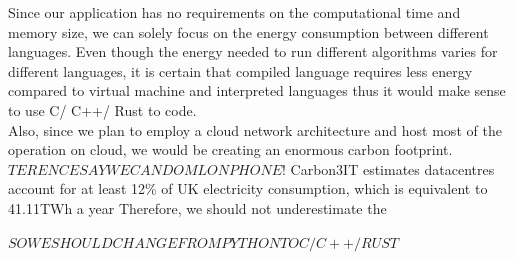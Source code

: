 Since our application has no requirements on the computational time and memory size, we can solely focus on the energy consumption between 
different languages. Even though the energy needed to run different algorithms varies for different languages, it is certain that
compiled language requires less energy compared to virtual machine and interpreted languages thus it would make sense to use C/ C++/ Rust to code.\\
Also, since we plan to employ a cloud network architecture and host most of the operation on cloud, we would be creating an enormous carbon footprint. $TERENCE SAY WE CAN DO ML ON PHONE!$
Carbon3IT estimates datacentres account for at least 12\% of UK electricity consumption, which is equivalent to 41.11TWh a year \cite{carbon}
Therefore, we should not underestimate the 


$SO WE SHOULD CHANGE FROM PYTHON TO C/C++/RUST$
